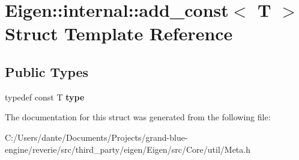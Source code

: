 \hypertarget{struct_eigen_1_1internal_1_1add__const}{}\section{Eigen\+::internal\+::add\+\_\+const$<$ T $>$ Struct Template Reference}
\label{struct_eigen_1_1internal_1_1add__const}
\subsection*{Public Types}
\begin{DoxyCompactItemize}
\item 
\mbox{\label{struct_eigen_1_1internal_1_1add__const_a26e88d975dcad60a4907a93c7498f392}} 
typedef const T {\bfseries type}
\end{DoxyCompactItemize}


The documentation for this struct was generated from the following file\+:\begin{DoxyCompactItemize}
\item 
C\+:/\+Users/dante/\+Documents/\+Projects/grand-\/blue-\/engine/reverie/src/third\+\_\+party/eigen/\+Eigen/src/\+Core/util/Meta.\+h\end{DoxyCompactItemize}
